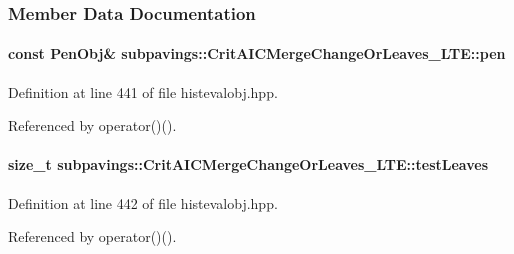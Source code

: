 \subsubsection{\-Member \-Data \-Documentation}
\hypertarget{classsubpavings_1_1CritAICMergeChangeOrLeaves__LTE_aa66d4c4f589e53de40c3dcb04c48d59c}{
\paragraph[{pen}]{\setlength{\rightskip}{0pt plus 5cm}const {\bf \-Pen\-Obj}\& {\bf subpavings\-::\-Crit\-A\-I\-C\-Merge\-Change\-Or\-Leaves\-\_\-\-L\-T\-E\-::pen}}}\label{classsubpavings_1_1CritAICMergeChangeOrLeaves__LTE_aa66d4c4f589e53de40c3dcb04c48d59c}


\-Definition at line 441 of file histevalobj.\-hpp.



\-Referenced by operator()().

\hypertarget{classsubpavings_1_1CritAICMergeChangeOrLeaves__LTE_ab71eaee1d035924d59aae000b5b2ebcb}{
\paragraph[{test\-Leaves}]{\setlength{\rightskip}{0pt plus 5cm}size\-\_\-t {\bf subpavings\-::\-Crit\-A\-I\-C\-Merge\-Change\-Or\-Leaves\-\_\-\-L\-T\-E\-::test\-Leaves}}}\label{classsubpavings_1_1CritAICMergeChangeOrLeaves__LTE_ab71eaee1d035924d59aae000b5b2ebcb}


\-Definition at line 442 of file histevalobj.\-hpp.



\-Referenced by operator()().

